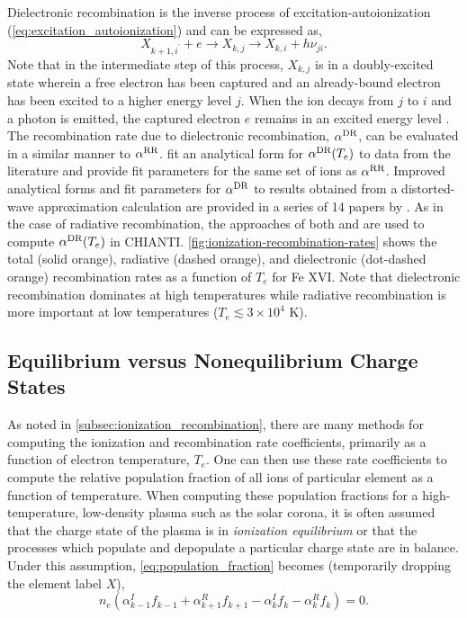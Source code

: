 Dielectronic recombination is the inverse process of excitation-autoionization (\autoref{eq:excitation_autoionization}) and can be expressed as,
\begin{equation}\label{eq:dielectronic_recombination}
    X_{k+1,i^\prime} + e \to X_{k,j} \to X_{k,i} + h\nu_{ji}.
\end{equation}
Note that in the intermediate step of this process, $X_{k,j}$ is in a doubly-excited state wherein a free electron has been captured and an already-bound electron has been excited to a higher energy level $j$. When the ion decays from $j$ to $i$ and a photon is emitted, the captured electron $e$ remains in an excited energy level \citep{bradshaw_collisional_2013}. The recombination rate due to dielectronic recombination, $\alpha^\textup{DR}$, can be evaluated in a similar manner to $\alpha^\textup{RR}$. \citet{shull_ionization_1982} fit an analytical form for $\alpha^\textup{DR}(T_e)$ to data from the literature and provide fit parameters for the same set of ions as $\alpha^\textup{RR}$. Improved analytical forms and fit parameters for $\alpha^\textup{DR}$ to results obtained from a distorted-wave approximation calculation are provided in a series of 14 papers by \citet{badnell_dielectronic_2003}. As in the case of radiative recombination, the approaches of both \citet{shull_ionization_1982} and \citet{badnell_dielectronic_2003} are used to compute $\alpha^\textup{DR}(T_e)$ in CHIANTI. \autoref{fig:ionization-recombination-rates} shows the total (solid orange), radiative (dashed orange), and dielectronic (dot-dashed orange) recombination rates as a function of $T_e$ for Fe XVI. Note that dielectronic recombination dominates at high temperatures while radiative recombination is more important at low temperatures ($T_e\lesssim3\times10^4$ K).

\subsection{Equilibrium versus Nonequilibrium Charge States}\label{subsec:ioneq_versus_nei}

As noted in \autoref{subsec:ionization_recombination}, there are many methods for computing the ionization and recombination rate coefficients, primarily as a function of electron temperature, $T_e$. One can then use these rate coefficients to compute the relative population fraction of all ions of particular element as a function of temperature. When computing these population fractions for a high-temperature, low-density plasma such as the solar corona, it is often assumed that the charge state of the plasma is in \textit{ionization equilibrium} or that the processes which populate and depopulate a particular charge state are in balance. Under this assumption, \autoref{eq:population_fraction} becomes (temporarily dropping the element label $X$),
\begin{equation}\label{eq:ionization_equilibrium}
    n_e(\alpha_{k-1}^I f_{k-1} + \alpha_{k+1}^R f_{k+1} - \alpha_{k}^I f_k - \alpha_k^R f_k) = 0.
\end{equation}

